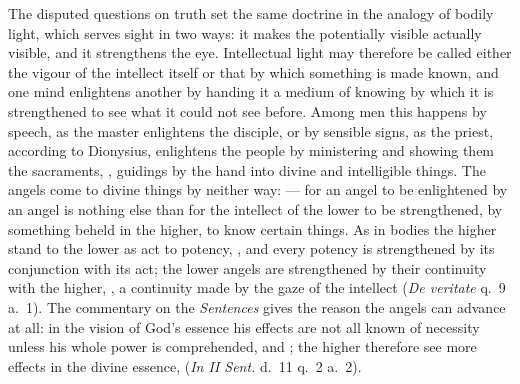 The disputed questions on truth set the same doctrine in the analogy of
bodily light, which serves sight in two ways: it makes the potentially
visible actually visible, and it strengthens the eye. Intellectual light
may therefore be called either the vigour of the intellect itself or that by
which something is made known, and one mind enlightens another by handing
it a medium of knowing by which it is strengthened to see what it could not
see before. Among men this happens by speech, as the master enlightens the
disciple, or by sensible signs, as the priest, according to Dionysius, enlightens
the people by ministering and showing them the sacraments, , guidings by the hand into divine
and intelligible things. The angels come to divine things by neither way:
 --- for an angel to be enlightened by an angel is nothing else
than for the intellect of the lower to be strengthened, by something beheld
in the higher, to know certain things. As in bodies the higher stand to the
lower as act to potency, , and every potency is strengthened by its conjunction with its
act; the lower angels are strengthened by their continuity with the
higher, ,
a continuity made by the gaze of the intellect (\emph{De veritate} q.~9
a.~1). The commentary on the \emph{Sentences} gives the reason the angels
can advance at all: in the vision of God's essence his effects are not all
known of necessity unless his whole power is comprehended, and ; the higher therefore see more effects in the divine essence,
(\emph{In II Sent.} d.~11 q.~2 a.~2).

